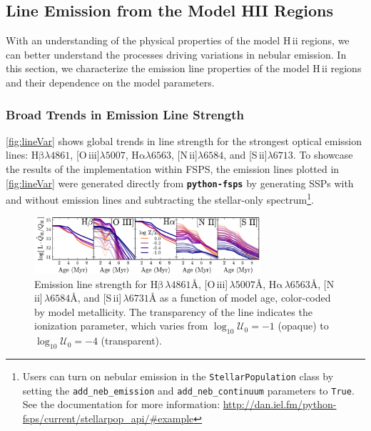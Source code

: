 \documentclass[linenumbers, trackchanges, tighten]{aastex61}%
\newcommand{\Fig}[1]{\autoref{fig:#1}}
\newcommand{\FSPS}{{\sc FSPS}\xspace}
\newcommand{\pFSPS}{{\tt \textbf{python-fsps}}\xspace}
\newcommand{\logten}{\ensuremath{\log_{10}}}
\newcommand{\nii}{[N\,{\sc ii}]\xspace}
\newcommand{\sii}{[S\,{\sc ii}]\xspace}
\newcommand{\oiii}{[O\,{\sc iii}]\xspace}
\newcommand{\ha}{\ensuremath{\mathrm{H\alpha}}}
\newcommand{\hb}{\ensuremath{\mathrm{H\beta}}}
\newcommand{\hii}{H\,{\sc ii}\xspace}
\newcommand\lam[1]{\ensuremath{\lambda #1}}
\newcommand{\ang}{\ensuremath{\mbox{\AA}}}
\newcommand{\logU}{\ensuremath{\logten \mathcal{U}_0}}
\begin{document}
\subsection{Line Emission from the Model HII Regions}\label{sec:models:lines}

With an understanding of the physical properties of the model \hii regions, we can better understand the processes driving variations in nebular emission. In this section, we characterize the emission line properties of the model \hii regions and their dependence on the model parameters. 

\subsubsection{Broad Trends in Emission Line Strength}\label{sec:models:lines:strength}

\Fig{lineVar} shows global trends in line strength for the strongest optical emission lines: \hb{}\lam{4861}, \oiii{}\lam{5007}, \ha{}\lam{6563}, \nii{}\lam{6584}, and \sii{}\lam{6713}. To showcase the results of the implementation within \FSPS, the emission lines plotted in \Fig{lineVar} were generated directly from \pFSPS by generating SSPs with and without emission lines and subtracting the stellar-only spectrum\footnote{Users can turn on nebular emission in the {\tt StellarPopulation} class by setting the {\tt add\_neb\_emission} and {\tt add\_neb\_continuum} parameters to {\tt True}. See the documentation for more information: \url{http://dan.iel.fm/python-fsps/current/stellarpop_api/\#example} }.

\begin{figure}[!htbp]
  \begin{centering}
    \includegraphics[width=0.75\textwidth]{f14.pdf}
    \caption{Emission line strength for \hb{}$\,\lambda4861\ang$, \oiii{}$\,\lambda5007\ang$, \ha{}$\,\lambda6563\ang$, \nii{}$\,\lambda6584\ang$, and \sii{}$\,\lambda6731\ang$ as a function of model age, color-coded by model metallicity. The transparency of the line indicates the ionization parameter, which varies from $\logU{}=-1$ (opaque) to $\logU{}=-4$ (transparent).}
    \label{fig:lineVar}
  \end{centering}
\end{figure}
\end{document}
